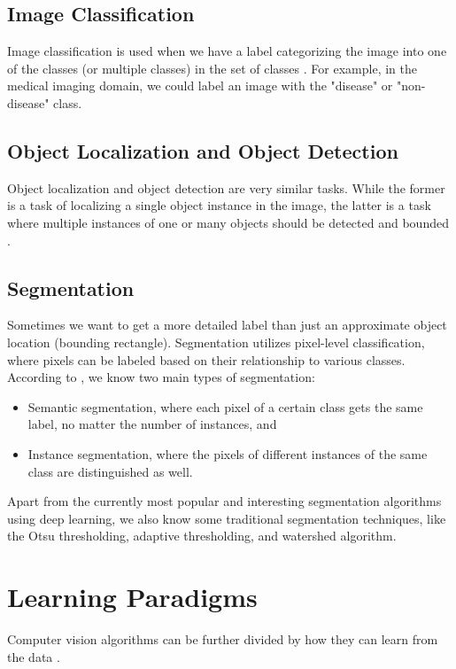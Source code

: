 \subsection{Image Classification}
Image classification is used when we have a label categorizing the image into one of the classes (or multiple classes) in the set of classes \cite{Alam2021}. For example, in the medical imaging domain, we could label an image with the "disease" or "non-disease" class.

\subsection{Object Localization and Object Detection}
Object localization and object detection are very similar tasks. While the former is a task of localizing a single object instance in the image, the latter is a task where multiple instances of one or many objects should be detected and bounded \cite{Alam2021}.

\subsection{Segmentation} Sometimes we want to get a more detailed label than just an approximate object location (bounding rectangle). Segmentation utilizes pixel-level classification, where pixels can be labeled based on their relationship to various classes. According to \cite{Alam2021}, we know two main types of segmentation:

\begin{itemize}
    \item Semantic segmentation, where each pixel of a certain class gets the same label, no matter the number of instances, and
    \item Instance segmentation, where the pixels of different instances of the same class are distinguished as well.
\end{itemize}

Apart from the currently most popular and interesting segmentation algorithms using deep learning, we also know some traditional segmentation techniques, like the Otsu thresholding, adaptive thresholding, and watershed algorithm.

\section{Learning Paradigms}
Computer vision algorithms can be further divided by how they can learn from the data \cite{Alam2021}.

